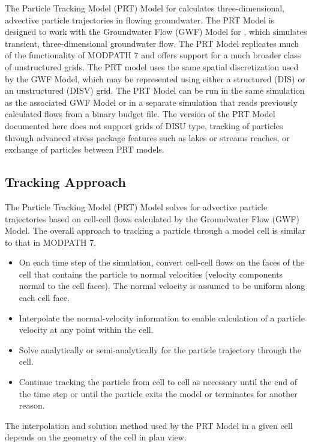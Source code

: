 
The Particle Tracking Model (PRT) Model for \mf calculates three-dimensional, advective particle trajectories in flowing groundwater. The PRT Model is designed to work with the Groundwater Flow (GWF) Model \citep{modflow6gwf} for \mf, which simulates transient, three-dimensional groundwater flow. The PRT Model replicates much of the functionality of MODPATH 7 \citep{pollock2016modpath7} and offers support for a much broader class of unstructured grids. The PRT model uses the same spatial discretization used by the GWF Model, which may be represented using either a structured (DIS) or an unstructured (DISV) grid. The PRT Model can be run in the same simulation as the associated GWF Model or in a separate simulation that reads previously calculated flows from a binary budget file. The version of the PRT Model documented here does not support grids of DISU type, tracking of particles through advanced stress package features such as lakes or streams reaches, or exchange of particles between PRT models.

\subsection{Tracking Approach} \label{sec:trackingapproach}

The Particle Tracking Model (PRT) Model solves for advective particle trajectories based on cell-cell flows calculated by the Groundwater Flow (GWF) Model. The overall approach to tracking a particle through a model cell is similar to that in MODPATH 7.

\begin{itemize}
\item On each time step of the simulation, convert cell-cell flows on the faces of the cell that contains the particle to normal velocities (velocity components normal to the cell faces). The normal velocity is assumed to be uniform along each cell face.
\item Interpolate the normal-velocity information to enable calculation of a particle velocity at any point within the cell.
\item Solve analytically or semi-analytically for the particle trajectory through the cell.
\item Continue tracking the particle from cell to cell as necessary until the end of the time step or until the particle exits the model or terminates for another reason.
\end{itemize}

The interpolation and solution method used by the PRT Model in a given cell depends on the geometry of the cell in plan view.

